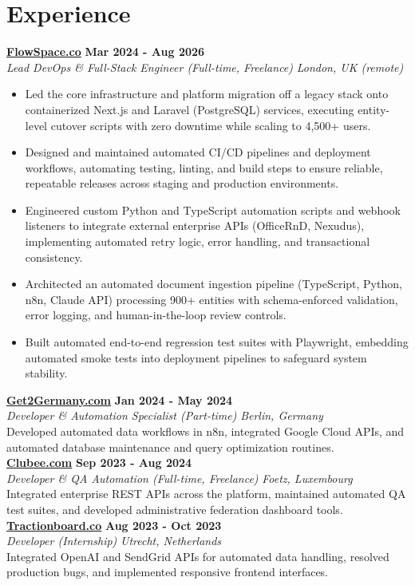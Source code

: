 \documentclass[a4paper,10pt]{article}
\newcommand{\role}[4]{%
 \textbf{#1} \hfill \textbf{#2}\\[1pt]%
 \textit{#3} \hfill \textit{#4}\\[2pt]%
}
\begin{document}
\section{Experience}

\role{\href{https://flowspace.co}{FlowSpace.co}}{Mar 2024 - Aug 2026}{Lead DevOps \& Full-Stack Engineer (Full-time, Freelance)}{London, UK (remote)}
\begin{itemize}
 \item Led the core infrastructure and platform migration off a legacy stack onto containerized Next.js and Laravel (PostgreSQL) services, executing entity-level cutover scripts with zero downtime while scaling to 4,500+ users.
 \item Designed and maintained automated CI/CD pipelines and deployment workflows, automating testing, linting, and build steps to ensure reliable, repeatable releases across staging and production environments.
 \item Engineered custom Python and TypeScript automation scripts and webhook listeners to integrate external enterprise APIs (OfficeRnD, Nexudus), implementing automated retry logic, error handling, and transactional consistency.
 \item Architected an automated document ingestion pipeline (TypeScript, Python, n8n, Claude API) processing 900+ entities with schema-enforced validation, error logging, and human-in-the-loop review controls.
 \item Built automated end-to-end regression test suites with Playwright, embedding automated smoke tests into deployment pipelines to safeguard system stability.
\end{itemize}

\role{\href{https://get2germany.com}{Get2Germany.com}}{Jan 2024 - May 2024}{Developer \& Automation Specialist (Part-time)}{Berlin, Germany}
Developed automated data workflows in n8n, integrated Google Cloud APIs, and automated database maintenance and query optimization routines.\\[1pt]

\role{\href{https://clubee.com}{Clubee.com}}{Sep 2023 - Aug 2024}{Developer \& QA Automation (Full-time, Freelance)}{Foetz, Luxembourg}
Integrated enterprise REST APIs across the platform, maintained automated QA test suites, and developed administrative federation dashboard tools.\\[1pt]

\role{\href{https://tractionboard.co}{Tractionboard.co}}{Aug 2023 - Oct 2023}{Developer (Internship)}{Utrecht, Netherlands}
Integrated OpenAI and SendGrid APIs for automated data handling, resolved production bugs, and implemented responsive frontend interfaces.
\end{document}
